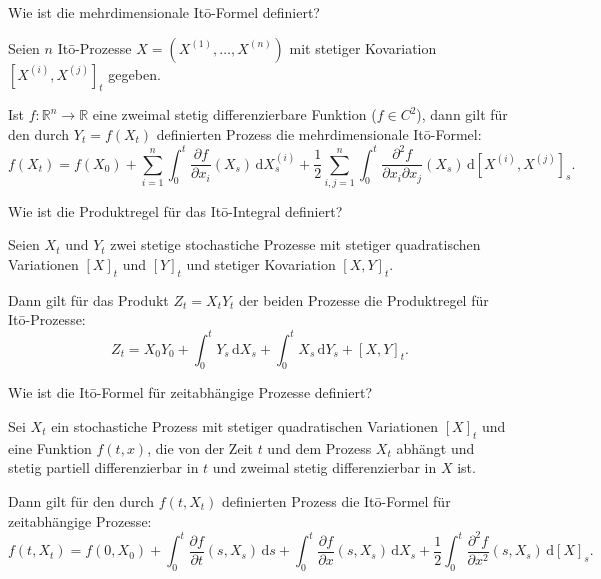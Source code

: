 \begin{QandA}
    \item Wie ist die mehrdimensionale Itō-Formel definiert?
    \begin{answered}
        Seien $n$ Itō-Prozesse $X = (X^{(1)},\dotsc ,X^{(n)})$ mit stetiger Kovariation $[X^{(i)},X^{(j)}]_{t}$ gegeben.

        Ist $f: \mathbb{R}^{n} \to \mathbb{R}$ eine zweimal stetig differenzierbare Funktion ($f \in C^{2}$), dann gilt für den durch $Y_{t}=f(X_{t})$ definierten Prozess die mehrdimensionale Itō-Formel:
        \[
            f(X_{t})=f(X_{0})+\sum_{i=1}^{n}\int_{0}^{t}\frac{\partial f}{\partial x_{i}}(X_{s})\,{\mathrm{d}}X_{s}^{(i)}+\frac{1}{2}\sum_{i,j=1}^{n}\int_{0}^{t}\frac{\partial^{2}f}{\partial x_{i}\partial x_{j}}(X_{s})\,{\mathrm{d}}[X^{(i)},X^{(j)}]_{s}.
        \]
    \end{answered}

    \item Wie ist die Produktregel für das Itō-Integral definiert?
    \begin{answered}
        Seien $X_{t}$ und $Y_{t}$ zwei stetige stochastiche Prozesse mit stetiger quadratischen Variationen $[X]_{t}$ und $[Y]_{t}$ und stetiger Kovariation $[X,Y]_{t}$.

        Dann gilt für das Produkt $Z_{t} = X_{t}Y_{t}$ der beiden Prozesse die Produktregel für Itō-Prozesse:
        \[
            Z_{t} = X_{0}Y_{0} + \int_{0}^{t} Y_{s}\,{\mathrm{d}}X_{s} + \int_{0}^{t} X_{s}\,{\mathrm{d}}Y_{s} + [X,Y]_{t}.
        \]
    \end{answered}

    \item Wie ist die Itō-Formel für zeitabhängige Prozesse definiert?
    \begin{answered}
        Sei $X_{t}$ ein stochastiche Prozess mit stetiger quadratischen Variationen $[X]_{t}$ und eine Funktion $f(t,x)$, die von der Zeit $t$ und dem Prozess $X_{t}$ abhängt und stetig partiell differenzierbar in $t$ und zweimal stetig differenzierbar in $X$ ist.

        Dann gilt für den durch $f(t,X_{t})$ definierten Prozess die Itō-Formel für zeitabhängige Prozesse:
        \[
            f(t,X_{t}) = f(0,X_{0}) + \int_{0}^{t} \frac{\partial f}{\partial t}(s,X_{s})\,{\mathrm{d}}s + \int_{0}^{t} \frac{\partial f}{\partial x}(s,X_{s})\,{\mathrm{d}}X_{s} + \frac{1}{2} \int_{0}^{t} \frac{\partial^{2} f}{\partial x^{2}}(s,X_{s})\,{\mathrm{d}}[X]_{s}.
        \]
    \end{answered}
\end{QandA}

